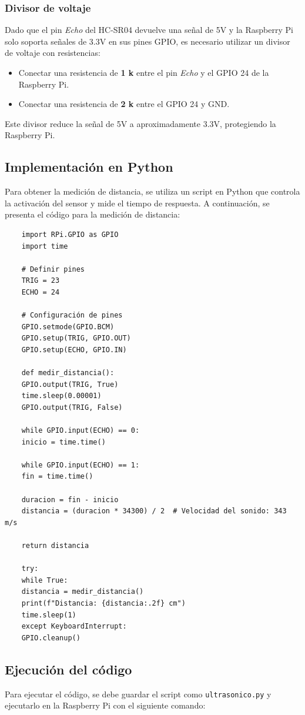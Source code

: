 \subsubsection{Divisor de voltaje}
Dado que el pin \textit{Echo} del HC-SR04 devuelve una señal de 5V y la Raspberry Pi solo soporta señales de 3.3V en sus pines GPIO, es necesario utilizar un divisor de voltaje con resistencias:

\begin{itemize}
	\item Conectar una resistencia de \textbf{1 k\textohm{}} entre el pin \textit{Echo} y el GPIO 24 de la Raspberry Pi.
	\item Conectar una resistencia de \textbf{2 k\textohm{}} entre el GPIO 24 y GND.
\end{itemize}

Este divisor reduce la señal de 5V a aproximadamente 3.3V, protegiendo la Raspberry Pi.

\subsection{Implementación en Python}
Para obtener la medición de distancia, se utiliza un script en Python que controla la activación del sensor y mide el tiempo de respuesta. A continuación, se presenta el código para la medición de distancia:

\begin{verbatim}
	import RPi.GPIO as GPIO
	import time
	
	# Definir pines
	TRIG = 23
	ECHO = 24
	
	# Configuración de pines
	GPIO.setmode(GPIO.BCM)
	GPIO.setup(TRIG, GPIO.OUT)
	GPIO.setup(ECHO, GPIO.IN)
	
	def medir_distancia():
	GPIO.output(TRIG, True)
	time.sleep(0.00001)
	GPIO.output(TRIG, False)
	
	while GPIO.input(ECHO) == 0:
	inicio = time.time()
	
	while GPIO.input(ECHO) == 1:
	fin = time.time()
	
	duracion = fin - inicio
	distancia = (duracion * 34300) / 2  # Velocidad del sonido: 343 m/s
	
	return distancia
	
	try:
	while True:
	distancia = medir_distancia()
	print(f"Distancia: {distancia:.2f} cm")
	time.sleep(1)
	except KeyboardInterrupt:
	GPIO.cleanup()
\end{verbatim}

\subsection{Ejecución del código}
Para ejecutar el código, se debe guardar el script como \texttt{ultrasonico.py} y ejecutarlo en la Raspberry Pi con el siguiente comando:

